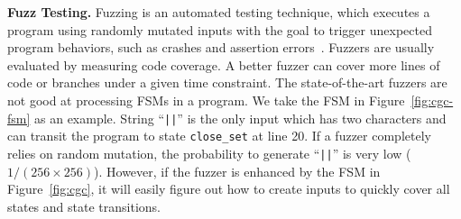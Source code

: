 \noindent\textbf{Fuzz Testing.}
Fuzzing is an automated testing technique,
which executes a program
using randomly mutated inputs
with the goal to trigger unexpected program behaviors,
such as crashes and assertion errors~\cite{afl,Angora,youwei-1}.
Fuzzers are usually evaluated by measuring code coverage.
A better fuzzer can cover more lines of code
or branches under a given time constraint.
The state-of-the-art fuzzers are not good at processing
FSMs in a program.
We take the FSM in Figure~\ref{fig:cgc-fsm} as an example.
String ``\verb/||/'' is the only input which has two characters and
can transit the program to state \texttt{close\_set} at line 20.
If a fuzzer completely relies on random mutation, the probability to
generate ``\verb/||/'' is very low ($1/(256 \times 256)$).
However, if the fuzzer is enhanced by the
FSM in Figure~\ref{fig:cgc},
it will easily figure out how to create inputs to quickly cover
all states and state transitions.






